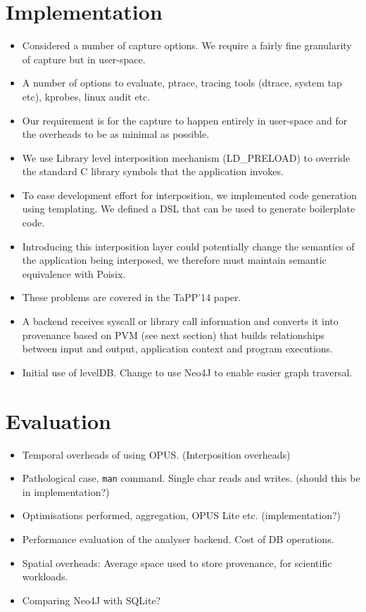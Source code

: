 \documentclass[withindex,glossary]{cam-thesis}
\begin{document}
\section{Implementation}
\begin{itemize}
\item Considered a number of capture options. We require a fairly fine granularity of capture but in user-space.
\item A number of options to evaluate, ptrace, tracing tools (dtrace, system tap etc), kprobes, linux audit etc.
\item Our requirement is for the capture to happen entirely in user-space and for the overheads to be as minimal as possible.
\item We use Library level interposition mechanism (LD\_PRELOAD) to override the standard C library symbols that the application invokes.
\item To ease development effort for interposition, we implemented code generation using templating. We defined a DSL that can be used to generate boilerplate code.
\item Introducing this interposition layer could potentially change the semantics of the application being interposed, we therefore must maintain semantic equivalence with Poisix.
\item These problems are covered in the TaPP'14 paper.
\item A backend receives syscall or library call information and converts it into provenance based on PVM (see next section) that builds relationships between input and output, application context and program executions.
\item Initial use of levelDB. Change to use Neo4J to enable easier graph traversal.
\end{itemize}

\section{Evaluation}
\begin{itemize}
\item Temporal overheads of using OPUS. (Interposition overheads)
\item Pathological case, \texttt{man} command. Single char reads and writes. (should this be in implementation?)
\item Optimisations performed, aggregation, OPUS Lite etc. (implementation?)
\item Performance evaluation of the analyser backend. Cost of DB operations.
\item Spatial overheads: Average space used to store provenance, for scientific workloads.
\item Comparing Neo4J with SQLite?
\end{itemize}
\end{document}
